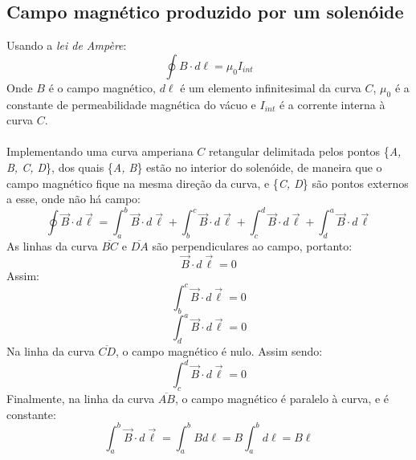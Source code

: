\documentclass[column,brazilian,12pt,a4paper,final]{article}
\begin{document}
\subsection{Campo magnético produzido por um solenóide}
      Usando a \textit{lei de Ampère}:
      \begin{equation}
        \oint B \cdot d\ell = \mu_0 I_{int}
      \end{equation}
      Onde $B$ é o campo magnético, $d\ell$ é um elemento 
      infinitesimal da 
      curva $C$, $\mu_0$ é a constante de permeabilidade magnética 
      do vácuo
      e $I_{int}$ é a corrente interna à curva $C$.
      \\\\
      Implementando uma curva amperiana $C$ retangular delimitada 
      pelos pontos 
      \{\textit{A, B, C, D}\}, dos quais \{\textit{A, B}\} estão no 
      interior do solenóide, de maneira que o campo magnético fique na 
      mesma 
      direção da curva, e \{\textit{C, D}\} são pontos externos a
      esse, onde não há campo:
      \begin{equation}
        \oint \vec{B} \cdot d\vec{\ell} = \int_a^b \vec{B} \cdot 
        d\vec{\ell} +
        \int_b^c \vec{B} \cdot d\vec{\ell} +
        \int_c^d \vec{B} \cdot d\vec{\ell} +
        \int_d^a \vec{B} \cdot d\vec{\ell}
      \end{equation}
      As linhas da curva $\overline{BC}$ e $\overline{DA}$ são
      perpendiculares ao campo, portanto:
      \begin{equation}
        \vec{B} \cdot d\vec{\ell} = 0
      \end{equation}
      Assim:
      \begin{equation}
        \int_b^c \vec{B} \cdot d\vec{\ell} = 0
      \end{equation}
      \begin{equation}
        \int_d^a \vec{B} \cdot d\vec{\ell} = 0
      \end{equation}
      Na linha da curva $\overline{CD}$, o campo magnético é nulo. 
      Assim sendo:
      \begin{equation}
        \int_c^d \vec{B} \cdot d\vec{\ell} = 0 
      \end{equation}
      Finalmente, na linha da curva $\overline{AB}$, o campo magnético
      é paralelo à curva, e é constante:
      \begin{equation}
        \int_a^b \vec{B} \cdot d\vec{\ell} = \int_a^b Bd\ell
        = B \int_a^b d\ell
        = B\ell
      \end{equation}
\end{document}
